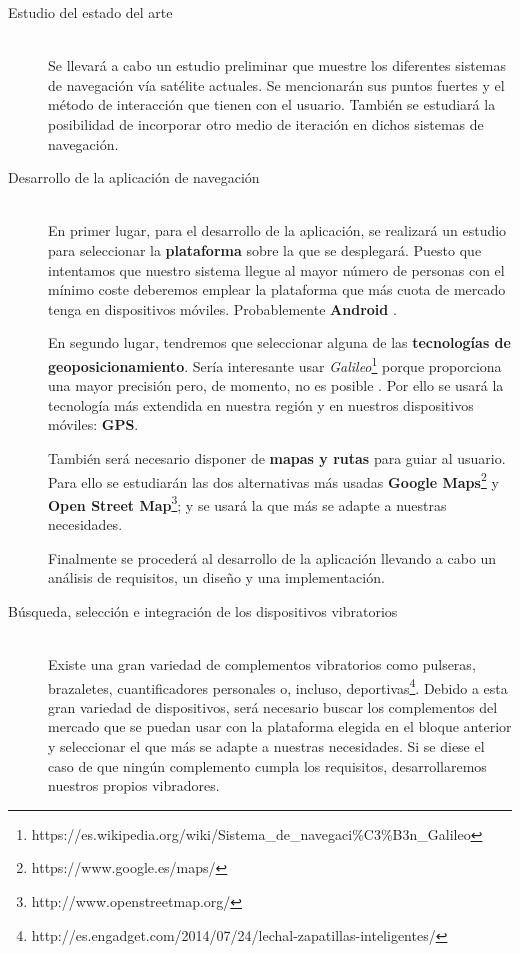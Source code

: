 \documentclass{pre-tfg}
\begin{document}
\begin{description}
\item[Estudio del estado del arte] \hfill \\
  Se llevará a cabo un estudio preliminar que muestre los diferentes sistemas de
  navegación vía satélite actuales. Se mencionarán sus puntos fuertes y el método de
  interacción que tienen con el usuario. También se estudiará la posibilidad de incorporar
  otro medio de iteración en dichos sistemas de navegación.

\item[Desarrollo de la aplicación de navegación] \hfill \\
  En primer lugar, para el desarrollo de la aplicación, se realizará un estudio para
  seleccionar la \textbf{plataforma} sobre la que se desplegará. Puesto que intentamos que
  nuestro sistema llegue al mayor número de personas con el mínimo coste deberemos emplear
  la plataforma que más cuota de mercado tenga en dispositivos móviles. Probablemente
  \textbf{Android} \cite{Mercado}.

  En segundo lugar, tendremos que seleccionar alguna de las \textbf{tecnologías de
    geoposicionamiento}. Sería interesante usar
  \textit{Galileo}\footnote{https://es.wikipedia.org/wiki/Sistema\_de\_navegaci\%C3\%B3n\_Galileo}
  porque proporciona una mayor precisión pero, de momento, no es posible \cite{SPSA} . Por
  ello se usará la tecnología más extendida en nuestra región y en nuestros dispositivos
  móviles: \textbf{GPS}.

  También será necesario disponer de \textbf{mapas y rutas} para guiar al usuario. Para
  ello se estudiarán las dos alternativas más usadas \textbf{Google
    Maps}\footnote{https://www.google.es/maps/} y \textbf{Open Street
    Map}\footnote{http://www.openstreetmap.org/}; y se usará la que más se adapte a
  nuestras necesidades.

  Finalmente se procederá al desarrollo de la aplicación llevando a cabo un análisis de
  requisitos, un diseño y una implementación.

\item[Búsqueda, selección e integración de los dispositivos vibratorios] \hfill \\
  Existe una gran variedad de complementos vibratorios como pulseras, brazaletes,
  cuantificadores personales o, incluso,
  deportivas\footnote{http://es.engadget.com/2014/07/24/lechal-zapatillas-inteligentes/}. Debido
  a esta gran variedad de dispositivos, será necesario buscar los complementos del mercado
  que se puedan usar con la plataforma elegida en el bloque anterior y seleccionar el que
  más se adapte a nuestras necesidades. Si se diese el caso de que ningún complemento
  cumpla los requisitos, desarrollaremos nuestros propios vibradores.


\end{description}
\end{document}
